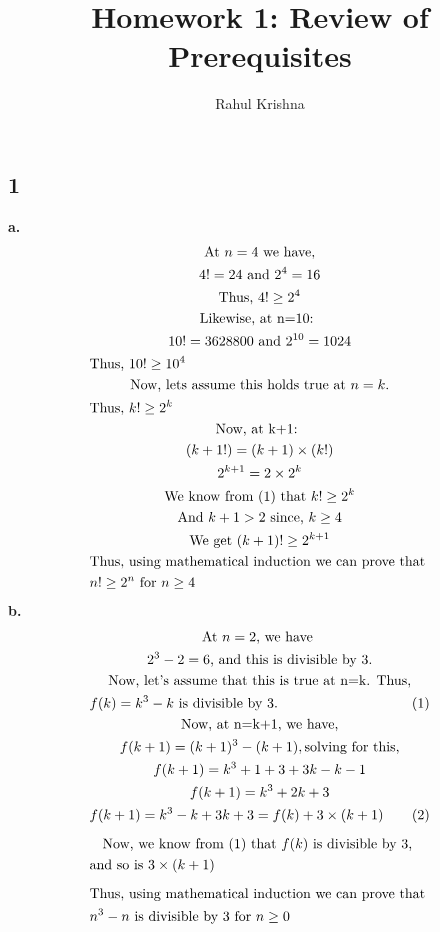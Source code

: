 \documentclass[10pt, twocolumn]{article}
\title{Homework 1: Review of Prerequisites}
\author{Rahul Krishna}
\date{}
\begin{document}
\maketitle
\subsection*{1}
\textbf{a.}
\begin{multline*}
\text{At $n=4$ we have,}\\
4!=24 \text{ and } 2^4=16 \\
\text{Thus, }4!\ge2^4\\
\text{Likewise, at n=10: }\\
10!=3628800 \text{ and } 2^{10}=1024 \\
\text{Thus, }10!\ge10^4\hfill\\
\text{Now, lets assume this holds true at } n=k.\\
\text{Thus, }k!\ge2^k\hfill\\
\text{Now, at k+1: }\\
( k+1! )=(k+1)\times(k!)\\
2^{k+1} = 2\times2^k\\
\text{We know from (1) that }k!\ge2^k\\\text{And }k+1>2\text{ since, }k\ge4\\
\text{We get }(k+1)!\ge2^{k+1}\\
\text{Thus, using mathematical induction we can prove that }\\n!\ge2^n\text{ for }n\ge4\hfill
\end{multline*}
\textbf{b.\\[-0.25cm]}
\begin{multline*}
\text{At $n=2$, we have }\\
2^3-2=6\text{, and this is divisible by 3.}\\
\text{Now, let's assume that this is true at n=k. Thus,}\\
f(k)=k^3-k\text{ is divisible by 3.}\hfill(1)\\
\text{Now, at n=k+1, we have,}\\
f(k+1)=(k+1)^3-(k+1), \text{solving for this,}\\
f(k+1)=k^3+1+3+3k-k-1\\
f(k+1)=k^3+2k+3\\
f(k+1)=k^3-k+3k+3=f(k)+3\times(k+1)\hfill(2)\\[0.2cm]
\text{Now, we know from (1) that $f(k)$ is divisible by 3, }\\
\text{and so is } 3\times(k+1)\hfill\\[0.2cm]
\text{Thus, using mathematical induction we can prove that }\\n^3-n\text{ is divisible by 3 for }n\ge0\hfill
\end{multline*}
\vfill
\end{document}
